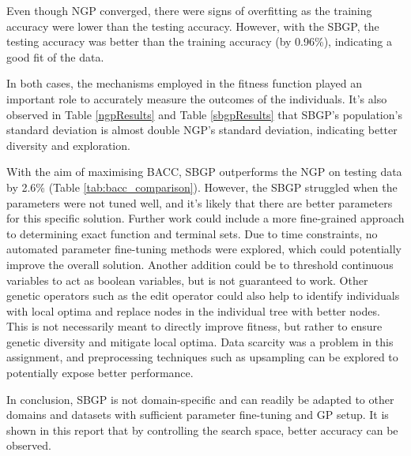 \documentclass{article}
\begin{document}
Even though NGP converged, there were signs of overfitting as the training accuracy were lower than the testing accuracy. However, with the SBGP, the testing accuracy was better than the training accuracy (by 0.96\%), indicating a good fit of the data.

In both cases, the mechanisms employed in the fitness function played an important role to accurately measure the outcomes of the individuals. It's also observed in Table \ref{ngpResults} and Table \ref{sbgpResults} that SBGP's population's standard deviation is almost double NGP's standard deviation, indicating better diversity and exploration.

With the aim of maximising BACC, SBGP outperforms the NGP on testing data by 2.6\% (Table \ref{tab:bacc_comparison}). However, the SBGP struggled when the parameters were not tuned well, and it's likely that there are better parameters for this specific solution. Further work could include a more fine-grained approach to determining exact function and terminal sets. Due to time constraints, no automated parameter fine-tuning methods were explored, which could potentially improve the overall solution. Another addition could be to threshold continuous variables to act as boolean variables, but is not guaranteed to work. Other genetic operators such as the edit operator could also help to identify individuals with local optima and replace nodes in the individual tree with better nodes. This is not necessarily meant to directly improve fitness, but rather to ensure genetic diversity and mitigate local optima. Data scarcity was a problem in this assignment, and preprocessing techniques such as upsampling can be explored to potentially expose better performance.

In conclusion, SBGP is not domain-specific and can readily be adapted to other domains and datasets with sufficient parameter fine-tuning and GP setup. It is shown in this report that by controlling the search space, better accuracy can be observed.



\end{document}
